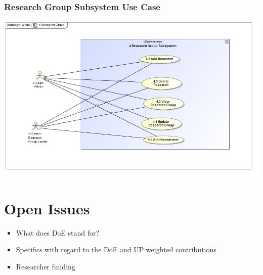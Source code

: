 \documentclass{article}
\begin{document}
	\subsubsection{Research Group Subsystem Use Case}
	\includegraphics[width=\textwidth]{ResearchGroup}
	

	\section{Open Issues}
	\begin{itemize}
		\item What does DoE stand for?
		\item Specifics with regard to the DoE and UP weighted contributions
		\item Researcher funding
	\end{itemize}
\end{document}

